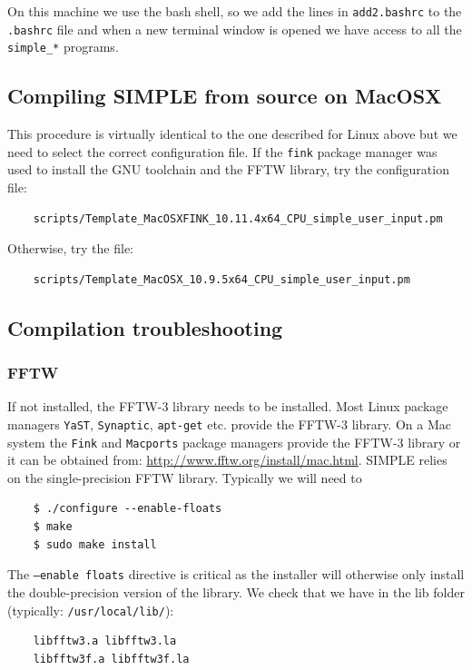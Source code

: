 \documentclass[a4paper,11pt]{article}
\begin{document}
On this machine we use the bash shell, so we add the lines in \texttt{add2.bashrc} to the \texttt{.bashrc} file and when a new terminal window is opened we have access to all the \texttt{simple\_*} programs.

\subsection{Compiling SIMPLE from source on MacOSX}
\label{compilemac}

This procedure is virtually identical to the one described for Linux above but we need to select the correct configuration file. If the \texttt{fink} package manager was used to install the GNU toolchain and the FFTW library, try the configuration file:
\begin{verbatim}
    scripts/Template_MacOSXFINK_10.11.4x64_CPU_simple_user_input.pm
\end{verbatim}
 Otherwise, try the file:
\begin{verbatim}
    scripts/Template_MacOSX_10.9.5x64_CPU_simple_user_input.pm
\end{verbatim}

\subsection{Compilation troubleshooting}
\label{compiletrouble}

\subsubsection{FFTW}

If not installed, the FFTW-3 library needs to be installed. Most Linux package managers \texttt{YaST}, \texttt{Synaptic}, \texttt{apt-get} etc. provide the FFTW-3 library. On a Mac system the \texttt{Fink} and \texttt{Macports} package managers provide the FFTW-3 library or it can be obtained from: \url{http://www.fftw.org/install/mac.html}. SIMPLE relies on the single-precision FFTW library. Typically we will need to
\begin{verbatim}
    $ ./configure --enable-floats
    $ make
    $ sudo make install
\end{verbatim}

The \texttt{--enable floats} directive is critical as the installer will otherwise only install the double-precision version of the library. We check that we have in the lib folder (typically: \texttt{/usr/local/lib/}):

\begin{verbatim}
    libfftw3.a libfftw3.la
    libfftw3f.a libfftw3f.la
\end{verbatim}
\end{document}
